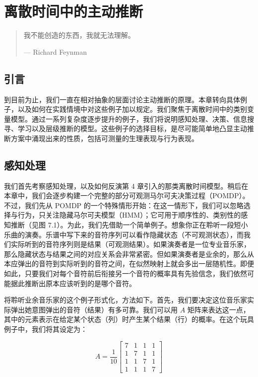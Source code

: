 \chapter{离散时间中的主动推断}

\begin{quote}
我不能创造的东西，我就无法理解。

--- Richard Feynman
\end{quote}

\section{引言}

到目前为止，我们一直在相对抽象的层面讨论主动推断的原理。本章转向具体例子，以及如何在实践情境中对这些例子加以规定。我们聚焦于离散时间中的类别变量模型。通过一系列复杂度逐步提升的例子，我们将说明感知处理、决策、信息搜寻、学习以及层级推断的模型。这些例子的选择目标，是尽可能简单地凸显主动推断方案中涌现出来的性质，包括可测量的生理表现与行为表现。

\section{感知处理}

我们首先考察感知处理，以及如何反演第 4 章引入的那类离散时间模型。稍后在本章中，我们会逐步构建一个完整的部分可观测马尔可夫决策过程（POMDP）。不过，我们先从 POMDP 的一个特殊情形开始：在这一情形下，我们可以忽略选择与行为，只关注隐藏马尔可夫模型（HMM）；它可用于顺序性的、类别性的感知推断（见图 7.1）。为此，我们先借助一个简单例子。想象你正在聆听一段短小乐曲的演奏。乐谱中写下来的音符序列可以看作隐藏状态（不可观测状态），而我们实际听到的音符序列则是结果（可观测结果）。如果演奏者是一位专业音乐家，那么隐藏状态与结果之间的对应关系会非常紧密。但如果演奏者是业余的，那么从本应弹出的音符到实际听到的音符之间，在似然映射上就会多出一层随机性。即便如此，只要我们对每个音符前后衔接另一个音符的概率具有先验信念，我们依然可能据此推断出原本应该听到的是哪个音符。

将聆听业余音乐家的这个例子形式化，方法如下。首先，我们要决定这位音乐家实际弹出她意图弹出的音符（结果）有多可靠。我们可以用 $A$ 矩阵来表达这一点，其中的元素表示在给定某个状态（列）时产生某个结果（行）的概率。在这个玩具例子中，我们将其设定为：

\begin{equation}
A=\frac{1}{10}
\begin{bmatrix}
7 & 1 & 1 & 1 \\
1 & 7 & 1 & 1 \\
1 & 1 & 7 & 1 \\
1 & 1 & 1 & 7
\end{bmatrix}
\label{eq:chapter7-A}
\end{equation}

